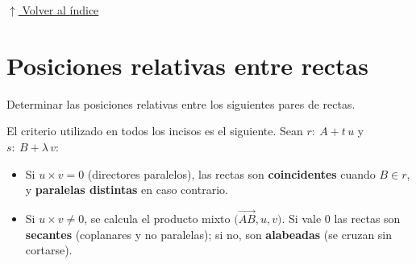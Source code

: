 \documentclass[12pt]{article}
\newcommand{\volverindice}{%
    \vspace{1em}%
    \begin{flushright}%
        \hyperlink{indice}{\small $\uparrow$ Volver al índice}%
    \end{flushright}%
}
\begin{document}
\volverindice
\newpage


\section{Posiciones relativas entre rectas}

Determinar las posiciones relativas entre los siguientes pares de rectas.

El criterio utilizado en todos los incisos es el siguiente. Sean
$r:\ A+t\,u$ y $s:\ B+\lambda\,v$:

\begin{itemize}
    \item Si $u\times v=0$ (directores paralelos), las rectas son
    \textbf{coincidentes} cuando $B\in r$, y \textbf{paralelas distintas}
    en caso contrario.
    \item Si $u\times v\neq0$, se calcula el producto mixto
    $\big(\overrightarrow{AB},u,v\big)$. Si vale $0$ las rectas son
    \textbf{secantes} (coplanares y no paralelas); si no, son
    \textbf{alabeadas} (se cruzan sin cortarse).
\end{itemize}
\end{document}
